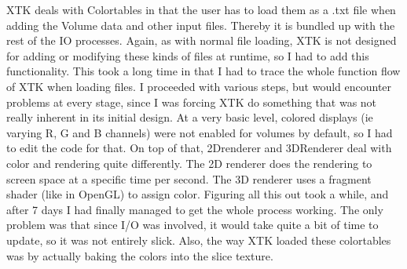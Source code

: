 \documentclass[a4paper,11pt,titlepage]{article}
\begin{document}
XTK deals with Colortables in that the user has to load them as a .txt file when adding the Volume data and other input files. Thereby it is bundled up with the rest of the IO processes. Again, as with normal file loading, XTK is not designed for adding or modifying these kinds of files at runtime, so I had to add this functionality. This took a long time in that I had to trace the whole function flow of XTK when loading files. I proceeded with various steps, but would encounter problems at every stage, since I was forcing XTK do something that was not really inherent in its initial design. At a very basic level, colored displays (ie varying R, G and B channels) were not enabled for volumes by default, so I had to edit the code for that. On top of that, 2Drenderer and 3DRenderer deal with color and rendering quite differently. The 2D renderer does the rendering to screen space at a specific time per second. The 3D renderer uses a fragment shader (like in OpenGL) to assign color. Figuring all this out took a while, and after 7 days I had finally managed to get the whole process working. The only problem was that since I/O was involved, it would take quite a bit of time to update, so it was not entirely slick. Also, the way XTK loaded these colortables was by actually baking the colors into the slice texture. 
\end{document}

